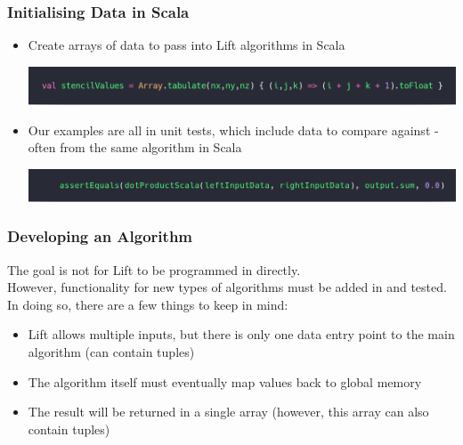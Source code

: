 \documentclass[10pt]{beamer}
\begin{document}
\begin{frame}
\frametitle{Initialising Data in Scala}
\begin{itemize}
    \item Create arrays of data to pass into Lift algorithms in Scala 
        \vspace{-.5cm}
\begin{block}{}
    \begin{center}
         \includegraphics[width=.85\textwidth]{../images/scalaArrays.png}
    \end{center}
\end{block}
    \item Our examples are all in unit tests, which include data to compare against - often from the same algorithm in Scala 
        \vspace{-.5cm}
    \begin{block}{}
        \begin{center}
            \includegraphics[width=.85\textwidth]{../images/unitTestData.png}
        \end{center}
    \end{block}
\end{itemize}
\end{frame}

\begin{frame}
\frametitle{Developing an Algorithm}
The goal is not for Lift to be programmed in directly.\\
\vspace{.1cm}
However, functionality for new types of algorithms must be added in and tested. In doing so, there are a few things to keep in mind: 
\begin{itemize}
    \item Lift allows multiple inputs, but there is only one data entry point to the main algorithm (can contain tuples)
    \item The algorithm itself must eventually map values back to global memory
    \item The result will be returned in a single array (however, this array can also contain tuples)
\end{itemize}
\end{frame}
\end{document}
